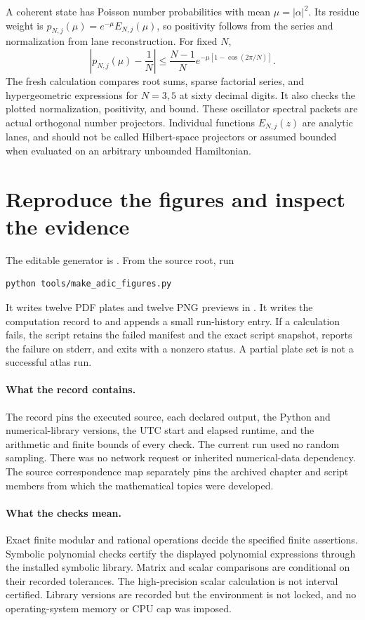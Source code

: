 A coherent state has Poisson number probabilities with mean $\mu=|\alpha|^2$. Its residue weight is $p_{N,j}(\mu)=e^{-\mu}E_{N,j}(\mu)$, so positivity follows from the series and normalization from lane reconstruction. For fixed $N$,
\[
\left|p_{N,j}(\mu)-\frac1N\right|
\le\frac{N-1}{N}e^{-\mu[1-\cos(2\pi/N)]}.
\]
The fresh calculation compares root sums, sparse factorial series, and hypergeometric expressions for $N=3,5$ at sixty decimal digits. It also checks the plotted normalization, positivity, and bound. These oscillator spectral packets are actual orthogonal number projectors. Individual functions $E_{N,j}(z)$ are analytic lanes, and should not be called Hilbert-space projectors or assumed bounded when evaluated on an arbitrary unbounded Hamiltonian.



\clearpage
\section{Reproduce the figures and inspect the evidence}

The editable generator is . From the source root, run
\begin{lstlisting}
python tools/make_adic_figures.py
\end{lstlisting}
It writes twelve PDF plates and twelve PNG previews in . It writes the computation record to  and appends a small run-history entry. If a calculation fails, the script retains the failed manifest and the exact script snapshot, reports the failure on stderr, and exits with a nonzero status. A partial plate set is not a successful atlas run.

\paragraph{What the record contains.}
The record pins the executed source, each declared output, the Python and numerical-library versions, the UTC start and elapsed runtime, and the arithmetic and finite bounds of every check. The current run used no random sampling. There was no network request or inherited numerical-data dependency. The source correspondence map separately pins the archived chapter and script members from which the mathematical topics were developed.

\paragraph{What the checks mean.}
Exact finite modular and rational operations decide the specified finite assertions. Symbolic polynomial checks certify the displayed polynomial expressions through the installed symbolic library. Matrix and scalar comparisons are conditional on their recorded tolerances. The high-precision scalar calculation is not interval certified. Library versions are recorded but the environment is not locked, and no operating-system memory or CPU cap was imposed.

